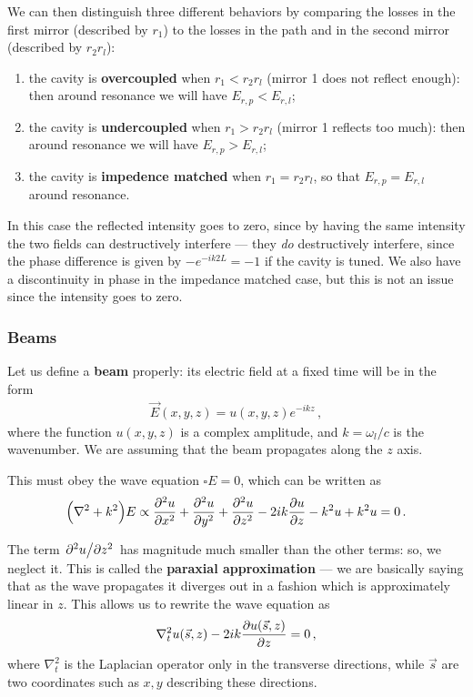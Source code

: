 \documentclass[main.tex]{subfiles}
\begin{document}
We can then distinguish three different behaviors by comparing the losses in the first mirror (described by \(r_1 \)) to the losses in the path and in the second mirror (described by \(r_2 r_l\)):
\begin{enumerate}
    \item the cavity is \textbf{overcoupled} when \(r_1 < r_2 r_{l}\) (mirror 1 does not reflect enough): then around resonance we will have \(E_{r, p } < E_{r, l}\);
    \item the cavity is \textbf{undercoupled} when \(r_1 >r_2 r_l\) (mirror 1 reflects too much): then around resonance we will have \(E_{r, p} > E_{r, l}\);
    \item the cavity is \textbf{impedence matched} when \(r_1 = r_2 r_{l}\), so that \(E_{r, p} = E_{r, l}\) around resonance.
\end{enumerate}

In this case the reflected intensity goes to zero, since by having the same intensity the two fields can destructively interfere --- they \emph{do} destructively interfere, since the phase difference is given by \(- e^{-ik2L} = -1\) if the cavity is tuned.
We also have a discontinuity in phase in the impedance matched case, but this is not an issue since the intensity goes to zero. 

\subsubsection{Beams}

Let us define a \textbf{beam} properly: its electric field at a fixed time will be in the form
%
\begin{align}
\vec{E}(x, y, z) = u (x, y, z) e^{-ikz}
\,,
\end{align}
%
where the function \(u(x, y, z)\) is a complex amplitude, and \(k = \omega_{l} / c\) is the wavenumber.
We are assuming that the beam propagates along the \(z\) axis.  

This must obey the wave equation \(\square E = 0\), which can be written as 
%
\begin{align}
\qty(\nabla^2 + k^2) E \propto
\pdv[2]{u}{x} +
\pdv[2]{u}{y} +
\pdv[2]{u}{z} - 2 ik \pdv{u}{z} - k^2 u + k^2 u = 0
\,.
\end{align}

The term \(\pdv*[2]{u}{z}\)
has magnitude much smaller than the other terms: so, we neglect it. 
This is called the \textbf{paraxial approximation} --- we are basically saying that as the wave propagates it diverges out in a fashion which is approximately linear in \(z\). 
This allows us to rewrite the wave equation as 
%
\begin{align}
\nabla^2_{t} u (\vec{s}, z) - 2ik \pdv{u(\vec{s}, z)}{z} = 0
\,,
\end{align}
%
where \(\nabla^2_t\) is the Laplacian operator only in the transverse directions, while \(\vec{s}\) are two coordinates such as \(x, y\) describing these directions. 
\end{document}
